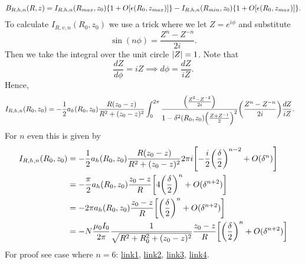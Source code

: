 \documentclass{article}
\begin{document}
\[\begin{aligned}
B_{R, h, n}(R, z)= I_{R,h,n}(R_{max}, z_0)\qty{1+O[\epsilon(R_0, z_{max})]} - I_{R,h,n}(R_{min}, z_0)\qty{1+O[\epsilon(R_0, z_{max})]}.
\end{aligned}\]
To calculate $I_{R,v,n}(R_0, z_0)$  we use a trick where we let $Z=e^{i\phi}$ and substitute
\[\sin(n\phi) = \frac{Z^n-Z^{-n}}{2i}.\]
Then we take the integral over the unit circle $\abs{Z}=1$.
Note that
\[\frac{dZ}{d\phi} = iZ \implies d\phi = \frac{dZ}{iZ}.\]
Hence,
\[\begin{aligned}
I_{R,h,n}(R_0, z_0) &= -\frac{1}{2}a_h(R_0, z_0)\frac{R(z_0-z)}{R^2+(z_0-z)^2}\int_0^{2\pi}\frac{\qty(\frac{Z^2-Z^{-2}}{2i})}{1-\delta^2(R_0, z_0)\qty(\frac{Z+Z^{-1}}{2})^2}\qty(\frac{Z^n-Z^{-n}}{2i}) \frac{dZ}{iZ}.
\end{aligned}\]
For $n$ even this is given by
\[\begin{aligned}
I_{R,h,n}(R_0, z_0) &= -\frac{1}{2}a_h(R_0, z_0)\frac{R(z_0-z)}{R^2+(z_0-z)^2}2\pi i \qty[-\frac{i}{2}\qty(\frac{\delta}{2})^{n-2} + O(\delta^n)] \\
&= -\frac{\pi}{2}a_h(R_0, z_0)\frac{z_0-z}{R} \qty[4\qty(\frac{\delta}{2})^n + O(\delta^{n+2})] \\
&= -2\pi a_h(R_0, z_0)\frac{z_0-z}{R} \qty[\qty(\frac{\delta}{2})^n + O(\delta^{n+2})] \\
&= -N\frac{\mu_0 I_0}{2\pi}\frac{1}{\sqrt{R^2+R_0^2+(z_0-z)^2}}\frac{z_0-z}{R} \qty[\qty(\frac{\delta}{2})^n + O(\delta^{n+2})]
\end{aligned}\]
For proof see case where $n=6$:
\href{https://www.wolframalpha.com/input?i=residues+of+%28%28z%5E2-1%2Fz%5E2%29%2F%282i%29%29+*+%28z%5E6-1%2Fz%5E6%29%2F%282i%29+%2F+%281-%28%28z%2B1%2Fz%29%2F%282%29%29%5E2*gamma%5E2%29+*+%281%2F%28I*z%29%29}{link1},
\href{https://www.wolframalpha.com/input?i=Residue%5B%28I%2F4+%28-z%5E%28-2%29+%2B+z%5E2%29+%28-z%5E%28-6%29+%2B+z%5E6%29%29%2F%28z+%281+-+%28EulerGamma%5E2+%28z%5E%28-1%29+%2B+z%29%5E2%29%2F4%29%29%2C+%7Bz%2C+0%7D%5D}{link2}, 
\href{https://www.wolframalpha.com/input?i=Residue%5B%28I%2F4+%28-z%5E%28-2%29+%2B+z%5E2%29+%28-z%5E%28-6%29+%2B+z%5E6%29%29%2F%28z+%281+-+%28EulerGamma%5E2+%28z%5E%28-1%29+%2B+z%29%5E2%29%2F4%29%29%2C+%7Bz%2C+%282+-+Sqrt%5B4+-+4+EulerGamma%5E2%5D%29%2F%282+EulerGamma%29%7D%5D}{link3}, 
\href{https://www.wolframalpha.com/input?i=series+%282+i+sqrt%281+-+x+%5E2%29+%2816+-+16+x+%5E2+%2B+3+x+%5E4%29+%288+%2B+x+%5E4+-+8+sqrt%281+-+x+%5E2%29+%2B+4+x+%5E2+%28sqrt%281+-+x+%5E2%29+-+2%29%29%5E2%29%2F%28+x+%5E8+%28sqrt%281+-+x+%5E2%29+-+1%29%5E8%29}{link4}.
\end{document}
